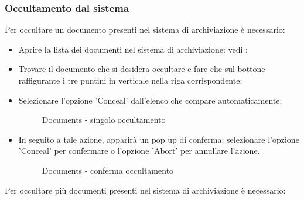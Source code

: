 \documentclass[10pt, a4paper]{article}
\begin{document}
\subsubsection{Occultamento dal sistema}
\label{sec:concealDocs}
Per occultare un documento presenti nel sistema di archiviazione è necessario:
\begin{itemize}
    \item Aprire la lista dei documenti nel sistema di archiviazione: vedi ;
    \item Trovare il documento che si desidera occultare e fare clic sul bottone raffigurante i tre puntini in verticale nella riga corrispondente;
    \item Selezionare l'opzione 'Conceal' dall'elenco che compare automaticamente;
    \begin{figure}[H]
        \centering  
        \caption{Documents - singolo occultamento}
        \label{img:concealSingle}
    \end{figure}
    \item In seguito a tale azione, apparirà un pop up di conferma: selezionare l'opzione 'Conceal' per confermare o l'opzione 'Abort' per annullare l'azione.
    \begin{figure}[H]
        \centering  
        \caption{Documents - conferma occultamento}
        \label{img:confirmConceal}
    \end{figure}
\end{itemize}
Per occultare più documenti presenti nel sistema di archiviazione è necessario:
\end{document}
